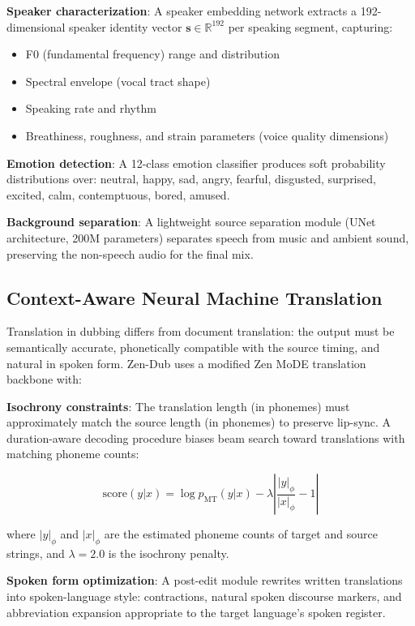 \documentclass[11pt,a4paper]{article}
\begin{document}
\textbf{Speaker characterization}: A speaker embedding network extracts a
192-dimensional speaker identity vector $\mathbf{s} \in \mathbb{R}^{192}$ per
speaking segment, capturing:
\begin{itemize}
\item F0 (fundamental frequency) range and distribution
\item Spectral envelope (vocal tract shape)
\item Speaking rate and rhythm
\item Breathiness, roughness, and strain parameters (voice quality dimensions)
\end{itemize}

\textbf{Emotion detection}: A 12-class emotion classifier produces soft probability
distributions over: neutral, happy, sad, angry, fearful, disgusted, surprised, excited,
calm, contemptuous, bored, amused.

\textbf{Background separation}: A lightweight source separation module (UNet architecture,
200M parameters) separates speech from music and ambient sound, preserving the
non-speech audio for the final mix.

\subsection{Context-Aware Neural Machine Translation}

Translation in dubbing differs from document translation: the output must be semantically
accurate, phonetically compatible with the source timing, and natural in spoken form.
Zen-Dub uses a modified Zen MoDE translation backbone with:

\textbf{Isochrony constraints}: The translation length (in phonemes) must approximately
match the source length (in phonemes) to preserve lip-sync. A duration-aware
decoding procedure biases beam search toward translations with matching phoneme counts:

\begin{equation}
\text{score}(y | x) = \log p_{\text{MT}}(y | x) - \lambda \left| \frac{|y|_{\phi}}{|x|_{\phi}} - 1 \right|
\end{equation}

where $|y|_\phi$ and $|x|_\phi$ are the estimated phoneme counts of target and source
strings, and $\lambda = 2.0$ is the isochrony penalty.

\textbf{Spoken form optimization}: A post-edit module rewrites written translations
into spoken-language style: contractions, natural spoken discourse markers, and
abbreviation expansion appropriate to the target language's spoken register.
\end{document}
